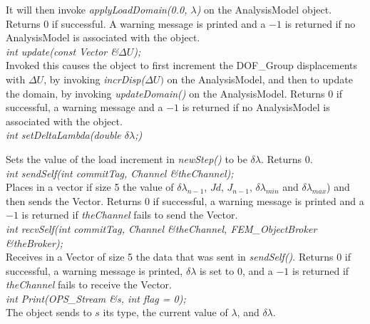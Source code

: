 \noindent It will then invoke
{\em applyLoadDomain(0.0, $\lambda$)} on the AnalysisModel
object. Returns $0$ if successful. A warning message is printed and a
$-1$ is returned if no AnalysisModel is associated with the object. \\

{\em int update(const Vector \&$\Delta U$);} \\
Invoked this causes the object to first increment the DOF\_Group
displacements with $\Delta U$, by invoking {\em incrDisp($\Delta U)$}
on the AnalysisModel, and then to update the domain, by invoking {\em
updateDomain()} on the AnalysisModel. Returns $0$ if successful, a
warning message and a $-1$ is returned if no AnalysisModel is
associated with the object. \\


{\em int setDeltaLambda(double $\delta \lambda$;)} 

Sets the value of the load increment in {\em newStep()} to be $\delta
\lambda$. Returns $0$.\\

{\em int sendSelf(int commitTag, Channel \&theChannel); } \\ 
Places in a vector if size 5 the value of $\delta \lambda_{n-1}$,
$Jd$, $J_{n-1}$, $\delta \lambda_{min}$ and $\delta \lambda_{max}$)
and then sends the Vector. Returns $0$ if successful, a warning
message is printed and a $-1$ is returned if {\em theChannel} fails to
send the Vector. \\ 

{\em int recvSelf(int commitTag, Channel \&theChannel, 
FEM\_ObjectBroker \&theBroker); } \\ 
Receives in a Vector of size 5 the data that was sent in {\em sendSelf()}.
Returns $0$ if successful, a warning message is printed, $\delta
\lambda$ is set to $0$, and a $-1$ is returned if {\em theChannel} 
fails to receive the Vector.\\

{\em int Print(OPS_Stream \&s, int flag = 0);}\\
The object sends to $s$ its type, the current value of $\lambda$, and
$\delta \lambda$. 